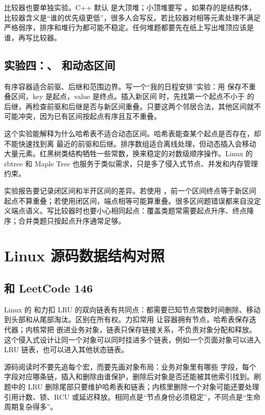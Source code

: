 比较器也要单独实验。C++ 默认  是大顶堆；小顶堆要写 。如果存的是结构体，比较器含义是“谁的优先级更低”，很多人会写反。若比较器对相等元素处理不满足严格弱序，排序和堆行为都可能不稳定。任何堆题都要先在纸上写出堆顶应该是谁，再写比较器。

\subsection{实验四：、 和动态区间}

有序容器适合前驱、后继和范围边界。写一个“我的日程安排”实验：用  保存不重叠区间，key 是起点，value 是终点。插入新区间 \code{[l,r)} 时，先找第一个起点不小于  的后继，再检查前驱和后继是否与新区间重叠。只要这两个邻居合法，其他区间就不可能冲突，因为已有区间按起点有序且互不重叠。

这个实验能解释为什么哈希表不适合动态区间。哈希表能查某个起点是否存在，却不能快速找到离  最近的前驱和后继。排序数组适合离线处理，但动态插入会移动大量元素。红黑树类结构牺牲一些常数，换来稳定的对数级顺序操作。Linux 的 rbtree 和 Maple Tree 也服务于类似需求，只是多了侵入式节点、并发和内存管理约束。

实验报告要记录闭区间和半开区间的差异。若使用 \code{[l,r)}，前一个区间终点等于新区间起点不算重叠；若使用闭区间，端点相等可能算重叠。很多区间题错误都来自没定义端点语义。写比较器时也要小心相同起点：覆盖类题常需要起点升序、终点降序；合并类题只按起点升序通常足够。

\section{Linux 源码数据结构对照}

\subsection{ 和 LeetCode 146}

Linux 的  和力扣 LRU 的双向链表有共同点：都需要已知节点常数时间删除、移动到头部和从尾部淘汰。区别在所有权。力扣常用  让容器拥有节点，哈希表保存迭代器；内核常把  嵌进业务对象，链表只保存链接关系，不负责对象分配和释放。这个侵入式设计让同一个对象可以同时挂进多个链表，例如一个页面对象可以进入 LRU 链表，也可以进入其他状态链表。

源码阅读时不要先追每个宏，而要先画对象布局：业务对象里有哪些  字段，每个字段对应哪条链，插入和删除由谁保护，删除后对象是否还能被其他索引找到。刷题中的 LRU 删除尾部只要维护哈希表和链表；内核里删除一个对象可能还要处理引用计数、锁、RCU 或延迟释放。相同点是“节点身份必须稳定”，不同点是“生命周期复杂得多”。

